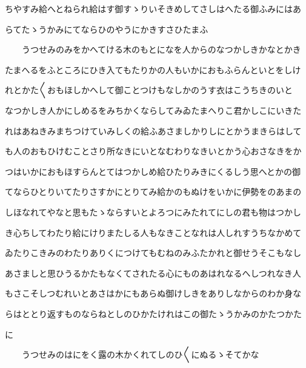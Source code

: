 \documentclass[a4paper,11pt,landscape]{ltjtarticle}
\begin{document}
ちやすみ給へとねられ給はす御すゝりいそきめしてさしはへたる御ふみにはあ
\par\medskip
らてたゝうかみにてならひのやうにかきすさひたまふ
\par\medskip
　　うつせみのみをかへてける木のもとになを人からのなつかしきかなとかき
\par\medskip
たまへるをふところにひき入てもたりかの人もいかにおもふらんといとをしけ
\par\medskip
れとかた〱おもほしかへして御ことつけもなしかのうす衣はこうちきのいと
\par\medskip
なつかしき人かにしめるをみちかくならしてみゐたまへりこ君かしこにいきた
\par\medskip
れはあねきみまちつけていみしくの給ふあさましかりしにとかうまきらはして
\par\medskip
も人のおもひけむことさり所なきにいとなむわりなきいとかう心おさなきをか
\par\medskip
つはいかにおもほすらんとてはつかしめ給ひたりみきにくるしう思へとかの御
\par\medskip
てならひとりいてたりさすかにとりてみ給かのもぬけをいかに伊勢をのあまの
\par\medskip
しほなれてやなと思もたゝならすいとよろつにみたれてにしの君も物はつかし
\par\medskip
き心ちしてわたり給にけりまたしる人もなきことなれは人しれすうちなかめて
\par\medskip
ゐたりこきみのわたりありくにつけてもむねのみふたかれと御せうそこもなし
\par\medskip
あさましと思ひうるかたもなくてされたる心にものあはれなるへしつれなき人
\par\medskip
もさこそしつむれいとあさはかにもあらぬ御けしきをありしなからのわか身な
\par\medskip
らはととり返すものならねとしのひかたけれはこの御たゝうかみのかたつかた
\par\medskip
に
\par\medskip
　　うつせみのはにをく露の木かくれてしのひ〱にぬるゝそてかな
\par\medskip
\end{document}
